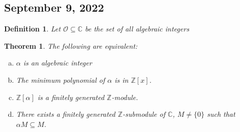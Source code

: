 \documentclass{article}
\newcommand{\C}{\mathbb{C}}
\newcommand{\Z}{\mathbb{Z}}
\newtheorem{theorem}{Theorem}
\newtheorem{definition}{Definition}
\begin{document}
\subsection{September 9, 2022}
\begin{definition}
Let $\mathcal{O}\subseteq \C$ be the set of all algebraic integers
\end{definition}
\begin{theorem}
The following are equivalent:
\begin{enumerate}[(a)]
    \item $\alpha$ is an algebraic integer
    \item The minimum polynomial of $\alpha$ is in $\Z[x]$.
    \item $\Z[\alpha]$ is a finitely generated $\Z$-module. 
    \item There exists a finitely generated $\Z$-submodule of $\C$, $M\neq \{0\}$ such that $\alpha M\subseteq M$.
\end{enumerate}
\end{theorem}
\end{document}
